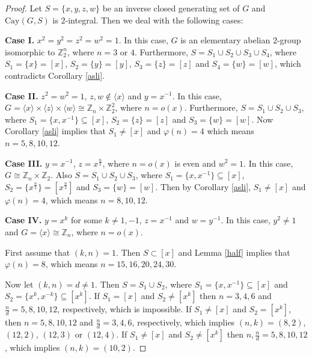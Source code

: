 \documentclass[12pt,a4paper]{article}
\begin{document}
	\begin{proof}
		Let $S=\{x,y,z,w\}$ be an inverse closed generating set of $G$ and $\mathrm{Cay}(G,S)$  is $2$-integral. Then we deal with the following cases:
		
		\textbf{Case I.} $x^2=y^2=z^2=w^2=1$. In this case, $G$ is an elementary abelian $2$-group isomorphic to $\mathbb Z_2^n$, where $n=3$ or $4$. Furthermore, $S=S_1\cup S_2\cup S_3\cup S_4$,
		where $S_1=\{x\}=[x]$, $S_2=\{y\}=[y]$, $S_3=\{z\}=[z]$ and $S_4=\{w\}=[w]$, which contradicts Corollary \ref{asli}.
		
		\textbf{Case II.} $z^2=w^2=1$, $z,w\notin\langle x\rangle$  and $y=x^{-1}$. In this case, $G=\langle x\rangle\times\langle z\rangle\times\langle w\rangle\cong\mathbb Z_n\times\mathbb{Z}_2^2$, where $n=o(x)$. Furthermore, $S=S_1\cup S_2\cup S_3$, where $S_1=\{x,x^{-1}\}\subseteq [x]$, $S_2=\{z\}=[z]$ and $S_3=\{w\}=[w]$. Now Corollary \ref{asli} implies
		that $S_1\neq [x]$ and $\varphi(n)=4$ which means $n=5,8,10,12$.
		
		\textbf{Case III.} $y=x^{-1}$, $z=x^{\frac{n}{2}}$, where $n=o(x)$ is even and $w^2=1$. In this case, $G\cong\mathbb Z_n\times\mathbb Z_2$. Also $S=S_1\cup S_2\cup S_3$, where
		$S_1=\{x,x^{-1}\}\subseteq [x]$, $S_2=\{x^\frac{n}{2}\}=[x^\frac{n}{2}]$ and $S_3=\{w\}=[w]$. Then by Corollary \ref{asli}, $S_1\neq [x]$ and $\varphi(n)=4$, which means $n=8,10,12$.
		
		\textbf{Case IV.} $y=x^k$ for some $k\neq 1,-1$, $z=x^{-1}$ and $w=y^{-1}$. In this case, $y^2\neq 1$ and $G=\langle x\rangle\cong\mathbb Z_n$, where $n=o(x)$. 
		
		First assume that $(k,n)=1$. Then $S\subset [x]$ and Lemma \ref{half} implies that $\varphi(n)=8$, which means $n=15,16,20,24,30$. 
		
		Now let $(k,n)=d\neq 1$. Then $S=S_1\cup S_2$, where $S_1=\{x,x^{-1}\}\subseteq [x]$ and $S_2=\{x^k,x^{-k}\}\subseteq [x^k]$. 
		If $S_1=[x]$ and $S_2\neq[x^k]$ then $n=3,4,6$ and $\frac{n}{d}=5,8,10,12$, respectively, which is impossible.
		If $S_1\neq [x]$ and $S_2=[x^k]$, then $n=5,8,10,12$ and $\frac{n}{d}=3,4,6$, respectively, which implies $(n,k)=(8,2)$, $(12,2)$, $(12,3)$ or $(12,4)$.
		If $S_1\neq [x]$ and $S_2\neq [x^k]$ then $n,\frac{n}{d}=5,8,10,12$, which implies $(n,k)=(10,2)$.
		

\end{proof}
\end{document}
